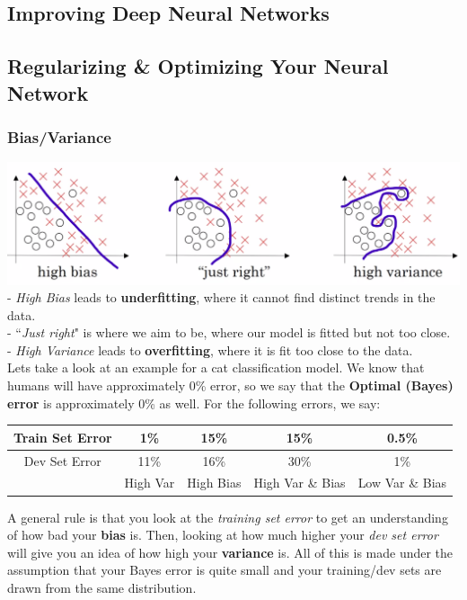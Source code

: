 \documentclass[11pt, a4paper]{article}
\begin{document}
\begin{spacing}{1.1}
	\section{Improving Deep Neural Networks}
	\subsection{Regularizing \& Optimizing Your Neural Network}
	\subsubsection{Bias/Variance}
	\includegraphics[scale=.4]{bias_var} \\
	\hspace*{3mm} - \textit{High Bias} leads to \textbf{underfitting}, where it cannot find distinct trends in the data. \\
	\hspace*{3mm} - ``\textit{Just right}" is where we aim to be, where our model is fitted but not too close. \\
	\hspace*{3mm} - \textit{High Variance} leads to \textbf{overfitting}, where it is fit too close to the data. \vspace*{1mm} \\
	Lets take a look at an example for a cat classification model. We know that humans will have approximately 0\% error, so we say that the \textbf{Optimal (Bayes) error} is approximately 0\% as well. For the following errors, we say:
	\begin{center}
	\begin{tabular}{ |c|c|c|c|c| } 
	\hline
	Train Set Error & 1\% & 15\% & 15\% & 0.5\% \\  \hline
	Dev Set Error & 11\% & 16\% & 30\% & 1\% \\  \hline
	 & High Var & High Bias & High Var \& Bias & Low Var \& Bias \\ \hline
	\end{tabular}
	\end{center}
	A general rule is that you look at the \textit{training set error} to get an understanding of how bad your \textbf{bias} is. Then, looking at how much higher your \textit{dev set error} will give you an idea of how high your \textbf{variance} is. All of this is made under the assumption that your Bayes error is quite small and your training/dev sets are drawn from the same distribution. \\~\\

\end{spacing}
\end{document}
